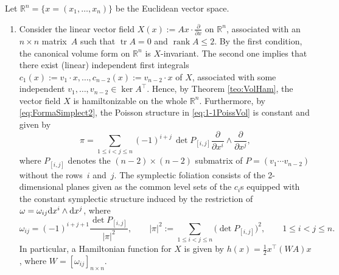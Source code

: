 \documentclass[pdftex]{sigma}%
\newcommand{\R}[1]{\mathbb{R}^{#1}}
\newcommand{\dd}{{\rm d}}
\numberwithin{equation}{section}
\begin{document}
\begin{Example}%
Let $\R{n} = \{x = (x_{1}, \dots, x_{n})\}$ be the Euclidean vector space.
\begin{enumerate}\itemsep=0pt
 \item Consider the linear vector field $X(x) := Ax \cdot \frac{\partial}{\partial x}$ on $\R{n}$, associated with an $n \times n$ mat\-rix~$A$ such that $\operatorname{tr}A = 0$ and $\operatorname{rank}A \leq 2$. By the first condition, the canonical volume form on $\R{n}$ is $X$-invariant. The second one implies that there exist (linear) independent first integrals $c_1(x) := v_1 \cdot x, \dots, c_{n-2}(x) := v_{n-2} \cdot x$ of $X$, associated with some independent $v_1, \dots, v_{n-2} \in \ker{A^{\top}}$. Hence, by Theorem \ref{teo:VolHam}, the vector field $X$ is hamiltonizable on the whole $\R{n}$. Furthermore, by \eqref{eq:FormaSimplect2}, the Poisson structure in \eqref{eq:1-1PoissVol} is constant and given by
 \begin{equation}\label{EcPpoisson}
 \pi = \sum_{1 \leq i < j \leq n} (-1)^{i+j}\,\det{P_{[i,j]}} \frac{\partial}{\partial{x^{i}}} \wedge \frac{\partial}{\partial{x^{j}}},
 \end{equation}
 where $P_{[i,j]}$ denotes the $(n-2) \times (n-2)$ submatrix of $P=(v_{1} \cdots v_{n-2})$ without the rows~$i$ and~$j$. The symplectic foliation consists of the 2-dimensional planes given as the common level sets of the $c_i$s equipped with the constant symplectic structure induced by the restriction of $\omega = \omega_{ij}\dd{x^{i}} \wedge \dd{x^{j}}$, where
 \begin{equation}\label{EcPformaSym}
 \omega_{ij} = (-1)^{i+j+1} \frac{\det{P_{[i,j]}}}{|\pi|^{2}}, \qquad
 |\pi|^{2} := \!\!\sum_{1 \leq i < j \leq n}\!\!\big(\det{P_{[i,j]}}\big)^{2}, \qquad
 1 \leq i < j \leq n.
 \end{equation}
 In particular, a Hamiltonian function for $X$ is given by $h(x) = \frac{1}{2}x^{\top}(WA)x$, where $W=[\omega_{ij}]_{n \times n}$.


\end{enumerate}
\end{Example}
\end{document}
